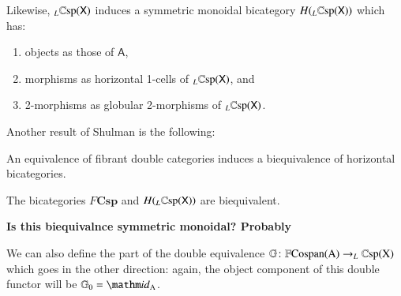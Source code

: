 \documentclass{amsart}
\begin{document}
Likewise, $_L \mathbb{C}\textnormal{sp}(\mathsf{X})$ induces a symmetric monoidal bicategory $H( {_L \mathbb{C}\textnormal{sp}(\mathsf{X})})$ which has:
\begin{enumerate}
\item{objects as those of $\mathsf{A}$,}
\item{morphisms as horizontal 1-cells of $_L \mathbb{C}\textnormal{sp}(\mathsf{X})$, and}
\item{2-morphisms as globular 2-morphisms of $_L \mathbb{C}\textnormal{sp}(\mathsf{X})$.}
\end{enumerate}
Another result of Shulman \cite{Shul2} is the following:
\begin{prop}
An equivalence of fibrant double categories induces a biequivalence of horizontal bicategories.
\end{prop}
\begin{cor}
The bicategories $F\mathbf{Csp}$ and $H( {_L \mathbb{C}\textnormal{sp}(\mathsf{X})})$ are biequivalent.
\end{cor}
\textbf{Is this biequivalnce symmetric monoidal? Probably}

We can also define the part of the double equivalence $\mathbb{G} \colon \mathbb{F}\textnormal{Cospan}(\mathrm{A}) \to _L \mathbb{C} \textnormal{sp}(\mathrm{X})$ which goes in the other direction: again, the object component of this double functor will be $\mathbb{G}_0 = \id_{\mathrm{A}}$.
\end{document}
